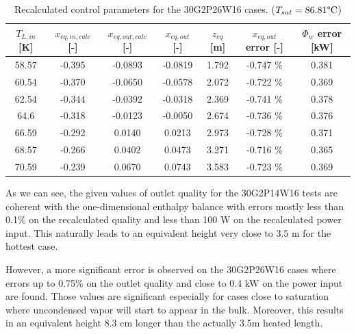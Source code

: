 \begin{table}[!h]
\centering
\begin{tabular}{c|c|c|c|c|c|c}
$T_{L,in}$ {[}K{]} & $x_{eq,in,calc}$ {[}-{]} & $x_{eq,out,calc}$ {[}-{]} & $x_{eq,out}$ {[}-{]} & $z_{eq}$ {[}m{]} & $x_{eq,out}$ error {[}-{]} & $\Phi_{w}$ error {[}kW{]} \\
\hline
\hline
58.57              & -0.395                   & -0.0893                   & -0.0819              & 1.792            & -0.747 \%                  & 0.381                     \\
60.54              & -0.370                   & -0.0650                   & -0.0578              & 2.072            & -0.722 \%                  & 0.369                     \\
62.54              & -0.344                   & -0.0392                   & -0.0318              & 2.369            & -0.741 \%                  & 0.378                     \\
64.6               & -0.318                   & -0.0123                   & -0.0050              & 2.674            & -0.736 \%                  & 0.376                     \\
66.59              & -0.292                   & 0.0140                    & 0.0213               & 2.973            & -0.728 \%                  & 0.371                     \\
68.57              & -0.266                   & 0.0402                    & 0.0473               & 3.271            & -0.716 \%                  & 0.365                     \\
70.59              & -0.239                   & 0.0670                    & 0.0743               & 3.583            & -0.723 \%                  & 0.369                    
\end{tabular}
\caption{Recalculated control parameters for the 30G2P26W16 cases. ($T_{sat} = 86.81\degree\mathrm{C}$)}
\label{tab:30P26_recalc}
\end{table}

As we can see, the given values of outlet quality for the 30G2P14W16 tests are coherent with the one-dimensional enthalpy balance with errors mostly less than 0.1\% on the recalculated quality and less than 100 W on the recalculated power input. This naturally leads to an equivalent height very close to $3.5$ m for the hottest case.


However, a more significant error is observed on the 30G2P26W16 cases where errors up to 0.75\% on the outlet quality and close to 0.4 kW on the power input are found. Those values are significant especially for cases close to saturation where uncondensed vapor will start to appear in the bulk. Moreover, this results in an equivalent height 8.3 cm longer than the actually 3.5m heated length.

